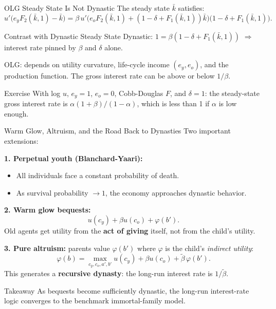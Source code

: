 \documentclass[aspectratio=169,10pt]{beamer}
\begin{document}
\begin{frame}{OLG Steady State Is Not Dynastic}
The steady state $\bar{k}$ satisfies:
\[
u'\big(e_yF_2(\bar{k},1)-\bar{k}\big)
=
\beta\,u'\big(e_oF_2(\bar{k},1)+(1-\delta+F_1(\bar{k},1))\bar{k}\big)
\big(1-\delta+F_1(\bar{k},1)\big).
\]

\begin{block}{Contrast with Dynastic Steady State}
Dynastic: $1=\beta(1-\delta+F_1(\bar{k},1))$ $\Rightarrow$ interest rate pinned by $\beta$ and $\delta$ alone.

OLG: depends on utility curvature, life-cycle income $(e_y,e_o)$, and the production function. The gross interest rate can be above or below $1/\beta$.
\end{block}

\begin{block}{Exercise}
With log $u$, $e_y=1$, $e_o=0$, Cobb-Douglas $F$, and $\delta=1$: the steady-state gross interest rate is $\alpha(1+\beta)/(1-\alpha)$, which is less than 1 if $\alpha$ is low enough.
\end{block}
\end{frame}

\begin{frame}{Warm Glow, Altruism, and the Road Back to Dynasties}
Two important extensions:

\medskip
\textbf{1. Perpetual youth (Blanchard-Yaari):}
\begin{itemize}
  \item All individuals face a constant probability of death.
  \item As survival probability $\to 1$, the economy approaches dynastic behavior.
\end{itemize}

\medskip
\textbf{2. Warm glow bequests:}
\[
u(c_y)+\beta u(c_o)+\varphi(b').
\]
Old agents get utility from the \textbf{act of giving} itself, not from the child's utility.

\medskip
\textbf{3. Pure altruism:} parents value $\varphi(b')$ where $\varphi$ is the child's \emph{indirect utility}:
\[
\varphi(b) = \max_{c_y,c_o,a',b'} u(c_y)+\beta u(c_o)+\tilde{\beta}\,\varphi(b').
\]
This generates a \textbf{recursive dynasty}: the long-run interest rate is $1/\tilde{\beta}$.

\begin{block}{Takeaway}
As bequests become sufficiently dynastic, the long-run interest-rate logic converges to the benchmark immortal-family model.
\end{block}
\end{frame}
\end{document}
